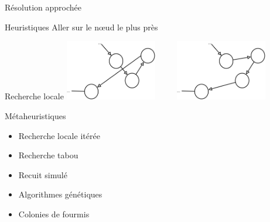 \documentclass{beamer}
\begin{document}
\begin{frame}{Résolution approchée}
    \begin{block}{Heuristiques}
        Aller sur le nœud le plus près
    \end{block}

    \begin{block}{Recherche locale}
        \centering
        \includegraphics[width=0.3\textwidth]{../rapport/graphes/2opt1.png}
        ~~~~ %
        \includegraphics[width=0.3\textwidth]{../rapport/graphes/2opt2.png}
    \end{block}
\end{frame}

\begin{frame}{Métaheuristiques}
    \begin{itemize}
        \item Recherche locale itérée
        \item Recherche tabou
        \item Recuit simulé
        \item Algorithmes génétiques
        \item Colonies de fourmis
    \end{itemize}
\end{frame}
\end{document}
